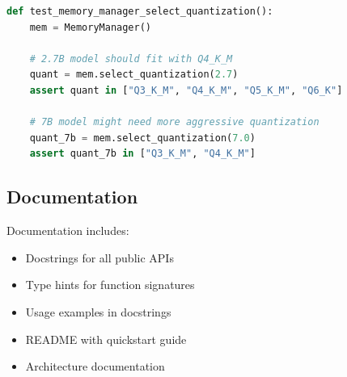 \begin{lstlisting}[language=Python, caption=Example Test]
def test_memory_manager_select_quantization():
    mem = MemoryManager()
    
    # 2.7B model should fit with Q4_K_M
    quant = mem.select_quantization(2.7)
    assert quant in ["Q3_K_M", "Q4_K_M", "Q5_K_M", "Q6_K"]
    
    # 7B model might need more aggressive quantization
    quant_7b = mem.select_quantization(7.0)
    assert quant_7b in ["Q3_K_M", "Q4_K_M"]
\end{lstlisting}

\subsection{Documentation}

Documentation includes:

\begin{itemize}
    \item Docstrings for all public APIs
    \item Type hints for function signatures
    \item Usage examples in docstrings
    \item README with quickstart guide
    \item Architecture documentation
\end{itemize}
